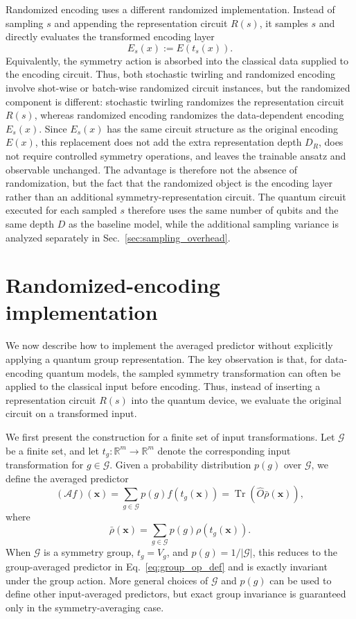 \documentclass[%
 reprint,
 amsmath,amssymb,
 aps,
 pra,
]{revtex4-2}
\theoremstyle{definition}
\begin{document}
Randomized encoding uses a different randomized implementation. Instead of sampling \(s\) and appending the representation circuit \(R(s)\), it samples \(s\) and directly evaluates the transformed encoding layer
\[
E_s(x):=E(t_s(x)).
\]
Equivalently, the symmetry action is absorbed into the classical data supplied to the encoding circuit. Thus, both stochastic twirling and randomized encoding involve shot-wise or batch-wise randomized circuit instances, but the randomized component is different: stochastic twirling randomizes the representation circuit \(R(s)\), whereas randomized encoding randomizes the data-dependent encoding \(E_s(x)\). Since \(E_s(x)\) has the same circuit structure as the original encoding \(E(x)\), this replacement does not add the extra representation depth \(D_R\), does not require controlled symmetry operations, and leaves the trainable ansatz and observable unchanged. The advantage is therefore not the absence of randomization, but the fact that the randomized object is the encoding layer rather than an additional symmetry-representation circuit. The quantum circuit executed for each sampled \(s\) therefore uses the same number of qubits and the same depth \(D\) as the baseline model, while the additional sampling variance is analyzed separately in Sec.~\ref{sec:sampling_overhead}.


\section{Randomized-encoding implementation}
\label{sec:randomized_encoding}

We now describe how to implement the averaged predictor without explicitly applying a quantum group representation. The key observation is that, for data-encoding quantum models, the sampled symmetry transformation can often be applied to the classical input before encoding. Thus, instead of inserting a representation circuit \(R(s)\) into the quantum device, we evaluate the original circuit on a transformed input.

We first present the construction for a finite set of input transformations. Let \(\mathcal{G}\) be a finite set, and let \(t_g:\mathbb{R}^m\to\mathbb{R}^m\) denote the corresponding input transformation for \(g\in\mathcal{G}\). Given a probability distribution \(p(g)\) over \(\mathcal{G}\), we define the averaged predictor
\begin{equation}
\label{eq:average_op_def_pauli_stochastic}
(\mathcal{A}f)(\bm{x})
=
\sum_{g\in\mathcal{G}} p(g) f(t_g(\bm{x}))
=
\operatorname{Tr}\!\left(\hat{O}\bar{\rho}(\bm{x})\right),
\end{equation}
where
\begin{equation}
\bar{\rho}(\bm{x})
=
\sum_{g\in\mathcal{G}}p(g)\rho(t_g(\bm{x})).
\end{equation}
When \(\mathcal{G}\) is a symmetry group, \(t_g=V_g\), and \(p(g)=1/|\mathcal{G}|\), this reduces to the group-averaged predictor in Eq.~\eqref{eq:group_op_def} and is exactly invariant under the group action. More general choices of \(\mathcal{G}\) and \(p(g)\) can be used to define other input-averaged predictors, but exact group invariance is guaranteed only in the symmetry-averaging case.
\end{document}

